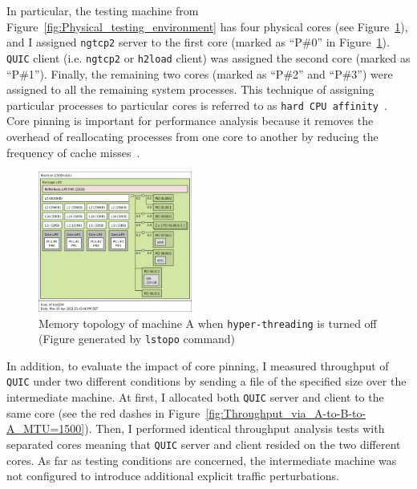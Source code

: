 \documentclass[12pt,a4paper]{report}
\begin{document}
In particular, the testing machine from Figure~\ref{fig:Physical_testing_environment} has four physical cores (see Figure~\ref{fig:memory_topology}), and I assigned \texttt{ngtcp2} server to the first core (marked as \enquote{P\#0} in Figure~\ref{fig:memory_topology}).
\texttt{QUIC} client (i.e. \texttt{ngtcp2} or \texttt{h2load} client) was assigned the second core (marked as \enquote{P\#1}).
Finally, the remaining two cores (marked as \enquote{P\#2} and \enquote{P\#3}) were assigned to all the remaining system processes.
This technique of assigning particular processes to particular cores is referred to as \texttt{hard CPU affinity}~\cite{CPU_Affinity}.
Core pinning is important for performance analysis because it removes the overhead of reallocating processes from one core to another by reducing the frequency of cache misses~\cite{Tuning_10Gb_network_cards_on_Linux}.

    \begin{figure}[htb]
    \centering
    \includegraphics[width=0.45\textwidth]{figs/memory_topology.png}
    \caption[Memory topology of machine A  when \texttt{hyper-threading} is turned off]{Memory topology of machine A  when \texttt{hyper-threading} is turned off (Figure generated by \texttt{lstopo} command)}
    \label{fig:memory_topology}
    \end{figure}

In addition, to evaluate the impact of core pinning, I measured throughput of \texttt{QUIC} under two different conditions by sending a file of the specified size over the intermediate machine.
At first, I allocated both \texttt{QUIC} server and client to the same core (see the red dashes in Figure~\ref{fig:Throughput_via_A-to-B-to-A_MTU=1500}).
Then, I performed identical throughput analysis tests with separated cores meaning that \texttt{QUIC} server and client resided on the two different cores.
As far as testing conditions are concerned, the intermediate machine was not configured to introduce additional explicit traffic perturbations.
\end{document}

